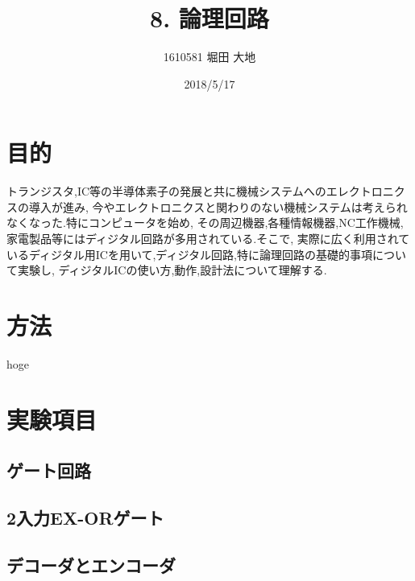 \documentclass[twocolumn, 10pt,a4j]{jsarticle}
\title{\vspace{-2.5cm}8. 論理回路}
\author{1610581 堀田 大地}
\date{2018/5/17}
\begin{document}
\maketitle{}
\section{目的}
トランジスタ,IC等の半導体素子の発展と共に機械システムへのエレクトロニクスの導入が進み,
今やエレクトロニクスと関わりのない機械システムは考えられなくなった.特にコンピュータを始め,
その周辺機器,各種情報機器,NC工作機械, 家電製品等にはディジタル回路が多用されている.そこで,
実際に広く利用されているディジタル用ICを用いて,ディジタル回路,特に論理回路の基礎的事項について実験し,
ディジタルICの使い方,動作,設計法について理解する.
\section{方法}
hoge
\section{実験項目}
\subsection{ゲート回路}
\subsection{2入力EX-ORゲート}
\subsection{デコーダとエンコーダ}
\end{document}
